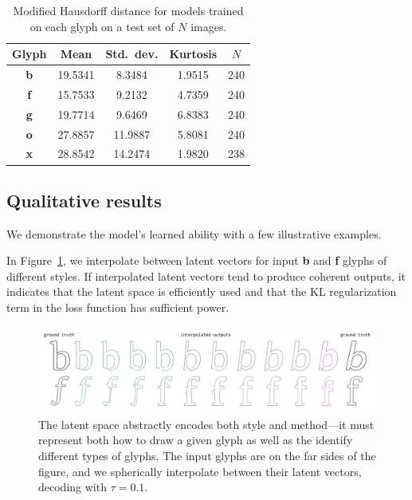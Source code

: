 \begin{table}[h]
\centering
\caption[Quantitative results for models trained on letter glyphs]
    {Modified Hausdorff distance for models trained on each glyph on a test set of $N$ images.\label{tbl:model-results}}
\begin{tabular}{c c c c c}
\toprule
    Glyph & Mean & Std.\ dev. & Kurtosis & $N$ \\ \midrule
    \textbf{b} & 19.5341 & 8.3484 & 1.9515 & 240 \\
    \textbf{f} & 15.7533 & 9.2132 & 4.7359 & 240 \\
    \textbf{g} & 19.7714 & 9.6469 & 6.8383 & 240 \\
    \textbf{o} & 27.8857 & 11.9887 & 5.8081 & 240 \\
    \textbf{x} & 28.8542 & 14.2474 & 1.9820 & 238 
\end{tabular}
\end{table}

\subsection{Qualitative results}
We demonstrate the model's learned ability with a few illustrative examples.

In Figure~\ref{fig:interp}, we interpolate between latent vectors for input \textbf{b} and \textbf{f} glyphs of different styles.
If interpolated latent vectors tend to produce coherent outputs, it indicates that the latent space is efficiently used and that the KL regularization term in the loss function has sufficient power.
\begin{figure}[h]
    \centering
	\includegraphics[width=\textwidth]{figures/interp}
    \caption[Latent space interpolation for the single-class model]
    {The latent space abstractly encodes both style and method---it must represent both how to draw a given glyph as well as the identify different types of glyphs.
    The input glyphs are on the far sides of the figure, and we spherically interpolate between their latent vectors, decoding with $\tau=0.1$.\label{fig:interp}}
\end{figure}


